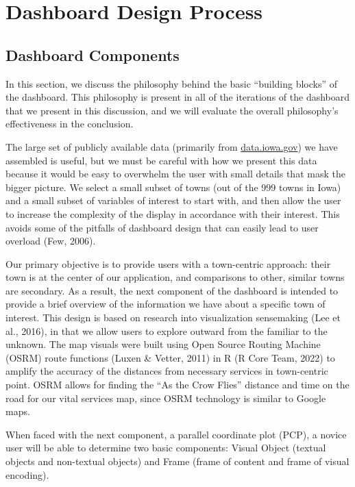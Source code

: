 \documentclass[print]{nuthesis}
\begin{document}
\hypertarget{dashboard-design-process}{%
\section{Dashboard Design Process}\label{dashboard-design-process}}

\hypertarget{dashboard-components}{%
\subsection{Dashboard Components}\label{dashboard-components}}

In this section, we discuss the philosophy behind the basic ``building blocks'' of the dashboard. This philosophy is present in all of the iterations of the dashboard that we present in this discussion, and we will evaluate the overall philosophy's effectiveness in the conclusion.

The large set of publicly available data (primarily from \url{data.iowa.gov}) we have assembled is useful, but we must be careful with how we present this data because it would be easy to overwhelm the user with small details that mask the bigger picture. We select a small subset of towns (out of the 999 towns in Iowa) and a small subset of variables of interest to start with, and then allow the user to increase the complexity of the display in accordance with their interest. This avoids some of the pitfalls of dashboard design that can easily lead to user overload (Few, 2006).

Our primary objective is to provide users with a town-centric approach: their town is at the center of our application, and comparisons to other, similar towns are secondary. As a result, the next component of the dashboard is intended to provide a brief overview of the information we have about a specific town of interest. This design is based on research into visualization sensemaking (Lee et al., 2016), in that we allow users to explore outward from the familiar to the unknown. The map visuals were built using Open Source Routing Machine (OSRM) route functions (Luxen \& Vetter, 2011) in R (R Core Team, 2022) to amplify the accuracy of the distances from necessary services in town-centric point. OSRM allows for finding the ``As the Crow Flies'' distance and time on the road for our vital services map, since OSRM technology is similar to Google maps.

When faced with the next component, a parallel coordinate plot (PCP), a novice user will be able to determine two basic components: Visual Object (textual objects and non-textual objects) and Frame (frame of content and frame of visual encoding).
\end{document}
